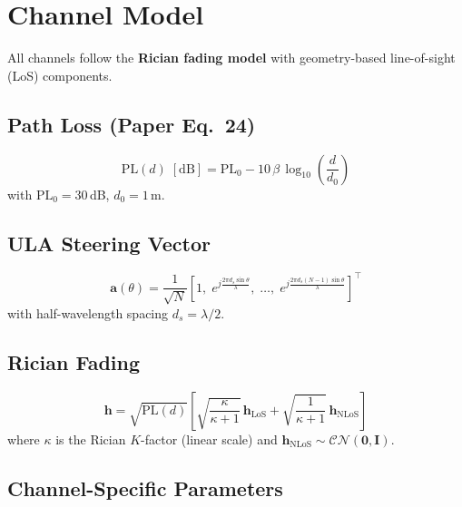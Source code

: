\documentclass[11pt,a4paper]{article}
\begin{document}
\section{Channel Model}

All channels follow the \textbf{Rician fading model} with geometry-based line-of-sight (LoS) components.

\subsection{Path Loss (Paper Eq.~24)}

\begin{equation}
\mathrm{PL}(d)\;[\text{dB}] = \mathrm{PL}_0 - 10\,\beta\,\log_{10}\!\left(\frac{d}{d_0}\right)
\end{equation}
with $\mathrm{PL}_0 = 30$\,dB, $d_0 = 1$\,m.

\subsection{ULA Steering Vector}

\begin{equation}
\mathbf{a}(\theta) = \frac{1}{\sqrt{N}}\left[1,\; e^{j\frac{2\pi d_s \sin\theta}{\lambda}},\; \ldots,\; e^{j\frac{2\pi d_s (N-1)\sin\theta}{\lambda}}\right]^\top
\end{equation}
with half-wavelength spacing $d_s = \lambda/2$.

\subsection{Rician Fading}

\begin{equation}
\mathbf{h} = \sqrt{\mathrm{PL}(d)} \left[\sqrt{\frac{\kappa}{\kappa+1}}\,\mathbf{h}_{\mathrm{LoS}} + \sqrt{\frac{1}{\kappa+1}}\,\mathbf{h}_{\mathrm{NLoS}}\right]
\end{equation}
where $\kappa$ is the Rician $K$-factor (linear scale) and $\mathbf{h}_{\mathrm{NLoS}} \sim \mathcal{CN}(\mathbf{0}, \mathbf{I})$.

\subsection{Channel-Specific Parameters}
\end{document}
